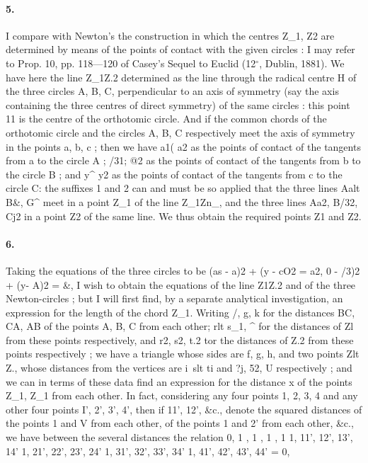 \documentclass[11pt,a4paper]{book}
\begin{document}
\paragraph{5.} I    compare    with    Newton's    the   construction   in   which   the    centres   Z_1,   Z2   are
determined   by   means   of    the   points   of    contact   with    the    given    circles  :    I    may   refer
to   Prop.    10,   pp.    118---120   of  Casey's   Sequel   to   Euclid   (12$^\circ$,  Dublin,  1881).     We  have
here   the   line   Z_1Z.2   determined   as   the   line   through    the   radical   centre  H  of  the  three
circles   A,   B,    C,   perpendicular   to   an   axis   of    symmetry   (say   the    axis    containing    the
three    centres   of  direct    symmetry)    of    the    same    circles  :    this    point    11    is    the    centre
of  the  orthotomic  circle.     And  if  the  common  chords  of  the  orthotomic  circle   and   the
circles   A,   B,    C  respectively   meet   the   axis   of   symmetry   in   the   points   a,   b,   c  ;    then
we    have    a1(    a2   as    the    points    of    contact    of   the    tangents    from    a    to    the    circle    A  ;
/31;   @2  as   the   points   of  contact   of  the   tangents   from   b   to   the   circle   B  ;    and    y^   y2
as   the   points   of  contact   of  the   tangents   from   c   to   the   circle    C:    the   suffixes  1  and
2   can   and   must   be   so   applied   that   the   three   lines   Aalt   B\&,    G^   meet   in   a    point
Z_1   of  the   line   Z_1Zn\_,   and   the    three    lines   Aa2,   B/32,    Cj2   in   a   point   Z2   of    the    same
line.     We  thus  obtain  the  required  points  Z1  and  Z2.
\paragraph{6.} Taking  the  equations  of  the  three  circles  to  be
(as  -  a)2  +  (y  -  cO2  =  a2,
0  -  /3)2  +  (y-  A)2  =  \&,
I  wish  to  obtain  the  equations  of  the  line  Z1Z.2  and  of  the  three  Newton-circles  ;
but  I  will  first  find,  by  a  separate  analytical  investigation,  an  expression  for  the
length  of  the  chord  Z_1.
Writing  /,  g,  k  for  the  distances  BC,  CA,  AB  of  the  points  A,  B,  C  from  each
other;  rlt  s_1,  ^  for  the  distances  of  Zl  from  these  points  respectively,  and  r2,  s2,  t.2
tor  the  distances  of  Z.2  from  these  points  respectively  ;  we  have  a  triangle  whose
sides  are  f,  g,  h,  and  two  points  Zlt  Z.,  whose  distances  from  the  vertices  are  i\,  slt
ti  and  ?j,  52,  U  respectively  ;  and  we  can  in  terms  of  these  data  find  an  expression
for  the  distance  x  of  the  points  Z_1,  Z_1  from  each  other.  In  fact,  considering  any
four  points  1,  2,  3,  4  and  any  other  four  points  I',  2',  3',  4',  then  if  11',  12',  \&c.,
denote  the  squared  distances  of  the  points  1  and  V  from  each  other,  of  the  points
1  and  2'  from  each  other,  \&c.,  we  have  between  the  several  distances  the  relation
0,  1    ,  1    ,  1    ,  1
1,  11',  12',  13',  14'
1,  21',  22',  23',  24'
1,  31',  32',  33',  34'
1,  41',  42',  43',  44'
=  0,
\end{document}
